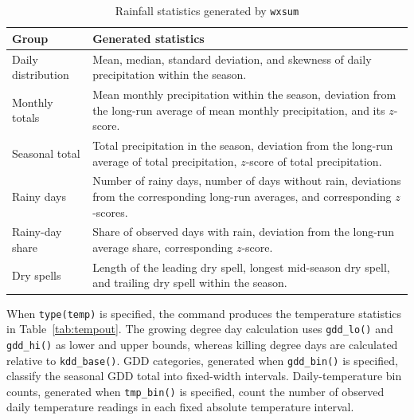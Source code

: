 \begin{table}[htbp]
	\caption{Rainfall statistics generated by \texttt{wxsum}}
	\label{tab:rainout}
	\begin{center}
		\begin{tabularx}{\textwidth}{lX}
			\hline
			Group & Generated statistics \\
			\hline
			Daily distribution & Mean, median, standard deviation, and skewness of daily precipitation within the season. \\
			Monthly totals & Mean monthly precipitation within the season, deviation from the long-run average of mean monthly precipitation, and its $z$-score. \\
			Seasonal total & Total precipitation in the season, deviation from the long-run average of total precipitation, $z$-score of total precipitation. \\
			Rainy days & Number of rainy days, number of days without rain, deviations from the corresponding long-run averages, and corresponding $z$-scores. \\
			Rainy-day share & Share of observed days with rain, deviation from the long-run average share, corresponding $z$-score. \\
			Dry spells & Length of the leading dry spell, longest mid-season dry spell, and trailing dry spell within the season. \\
			\hline
		\end{tabularx}
	\end{center}
\end{table}

When \texttt{type(temp)} is specified, the command produces the temperature statistics in Table~\ref{tab:tempout}. The growing degree day calculation uses \texttt{gdd\_lo()} and \texttt{gdd\_hi()} as lower and upper bounds, whereas killing degree days are calculated relative to \texttt{kdd\_base()}. GDD categories, generated when \texttt{gdd\_bin()} is specified, classify the seasonal GDD total into fixed-width intervals. Daily-temperature bin counts, generated when \texttt{tmp\_bin()} is specified, count the number of observed daily temperature readings in each fixed absolute temperature interval.

